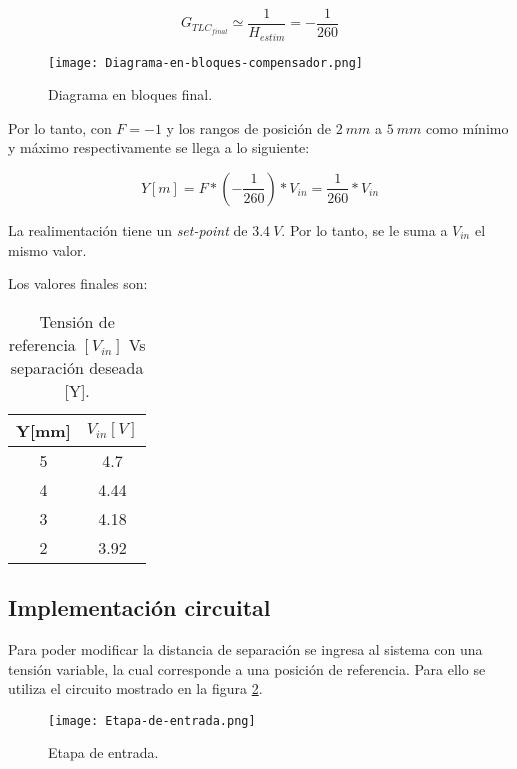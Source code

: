 \begin{equation} 
	G_{TLC_{final}} \simeq \frac{1}{H_{estim}} = - \frac{1}{260}
\end{equation}

\begin{figure}[H]
	\centering
	\texttt{[image: Diagrama-en-bloques-compensador.png]}
	\caption{Diagrama en bloques final.}
	\label{fig:diag-bloques-compensador}
\end{figure}

\noindent Por lo tanto, con $F=-1$ y los rangos de posición de $2\:mm$ a $5\:mm$ como mínimo y máximo respectivamente se llega a lo siguiente:

\begin{equation} 
	Y[m] = F * (-\frac{1}{260})*V_{in} =\frac{1}{260}*V_{in} 
\end{equation}

\noindent La realimentación tiene un \textsl{set-point} de $3.4\:V$. Por lo tanto, se le suma a $V_{in}$ el mismo valor.

\noindent Los valores finales son:


\begin{table}[H]
	\begin{center}
		\begin{tabular}{| c | c |}
			\hline
			Y[mm] & $V_{in}[V]$\\ \hline
			5 & 4.7\\ \hline
			4 & 4.44 \\ \hline
			3 & 4.18\\ \hline
			2 &	3.92 \\ \hline		
		\end{tabular}
		\caption{Tensión de referencia $[V_{in}]$ Vs separación deseada [Y].}
		\label{tension-ref-vs-separacion-deseada}
	\end{center}
\end{table}

\subsection{Implementación circuital}

\noindent Para poder modificar la distancia de separación se ingresa al sistema con una tensión variable, la cual corresponde a una posición de referencia. Para ello se utiliza el circuito mostrado en la figura \ref{fig:etapa-de-entrada}.

\begin{figure}[H]
	\centering
	\texttt{[image: Etapa-de-entrada.png]}
	\caption{ Etapa de entrada.}
	\label{fig:etapa-de-entrada}
\end{figure}

